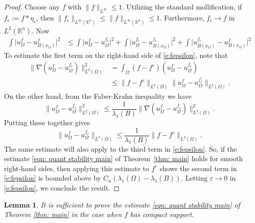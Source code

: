 \documentclass[10pt,a4paper]{amsart}
\numberwithin{equation}{section}
\newtheorem{lemma}[theorem]{Lemma}
\def\e{\varepsilon}
\def\W{\Omega}
\begin{document}
 \begin{proof}
 Choose any $f$ with $\| f\|_{L^{\infty}} \leq 1$.
  Utilizing the standard mollification, if $f_{\epsilon} := f \ast \eta_{\epsilon}$, then 
  $\| f_{\epsilon} \|_{L^{\infty}(\mathbb{R}^n)} \leq \| f \|_{L^{\infty}(\mathbb{R}^n)} \leq 1$. Furthermore, $f_{\epsilon} \to f$ in $L^2(\mathbb{R}^n)$. Now 
  \begin{equation} \label{e:fepsilon}
  \begin{split}
    \int \big|u_{\W}^f- u_{B(x_{\W})}^f \big|^2
    &\leq \int \big|u_{\W}^f- u_{\W}^{f_{\epsilon}} \big|^2 + \int \big|u_{\W}^{f_{\epsilon}}- u_{B(x_{\W})}^{f_{\epsilon}} \big|^2  
    + \int \big|u_{B(x_{\W})}^{f_{\epsilon}}- u_{B(x_{\W})}^f \big|^2 
    \end{split}
  \end{equation}
To estimate the first term on the right-hand side of \eqref{e:fepsilon}, note that
  \[
   \begin{aligned}
       \| \nabla (u_{\W}^f- u_{\W}^{f_{\epsilon}}) \|^2_{L^2(\W)}
       &= \int_{\W} (f-f^{\e})(u_{\W}^f- u_{\W}^{f_{\epsilon}}) \\
       &\leq \| f - f^{\e} \|_{L^2(\W)} \| u_{\W}^f- u_{\W}^{f_{\epsilon}}\|_{L^2(\W)}. 
   \end{aligned}
  \]
On the other hand, from the Faber-Krahn inequality we have 
  \[
  \| u_{\W}^f - u_{\W}^{f_{\e}} \|^2_{L^2(\W)} \leq \frac{1}{\lambda_1(B)} \|\nabla (u_{\W}^f - u_{\W}^{f_{\e}}) \|^2_{L^2(\W)}.
  \]
Putting these together gives 
  \[
  \| u_{\W}^f - u_{\W}^{f_{\e}} \|_{L^2(\W)} \leq \frac{1}{\lambda_1(B)} \| f - f^{\e} \|_{L^2(\W)}. 
  \]
  The same estimate will also apply to the third term in \eqref{e:fepsilon}. 
  So, if the estimate \eqref{eqn: quant stability main} of Theorem~\ref{thm: main} holds for smooth right-hand sides, then applying this estimate to $f^\e$ shows the second term in \eqref{e:fepsilon} is bounded above by $C_{n}(\lambda_1(\W) - \lambda_1(B))$.
  Letting $\e \to 0$ in \eqref{e:fepsilon}, we conclude the result.  
 \end{proof}



\begin{lemma}\label{lem:fcptspt}
    It is sufficient to prove  the estimate \eqref{eqn: quant stability main} of  Theorem \ref{thm: main} in the case when  $f$ has compact support.
\end{lemma}
%
%
\end{document}
